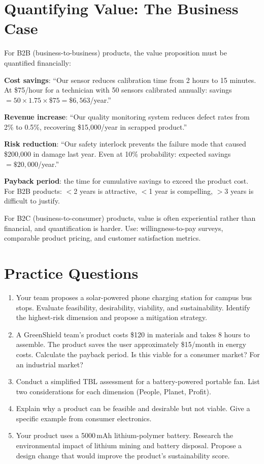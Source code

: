 \documentclass[11pt,letterpaper,twoside,openany]{book}
\begin{document}
\section{Quantifying Value: The Business Case}
For B2B (business-to-business) products, the value proposition must be quantified financially:

\textbf{Cost savings}: ``Our sensor reduces calibration time from 2 hours to 15 minutes. At \$75/hour for a technician with 50 sensors calibrated annually: savings $= 50 \times 1.75 \times \$75 = \$6{,}563$/year.''

\textbf{Revenue increase}: ``Our quality monitoring system reduces defect rates from 2\% to 0.5\%, recovering \$15{,}000/year in scrapped product.''

\textbf{Risk reduction}: ``Our safety interlock prevents the failure mode that caused \$200{,}000 in damage last year. Even at 10\% probability: expected savings $= \$20{,}000$/year.''

\textbf{Payback period}: the time for cumulative savings to exceed the product cost. For B2B products: $<$2 years is attractive, $<$1 year is compelling, $>$3 years is difficult to justify.

For B2C (business-to-consumer) products, value is often experiential rather than financial, and quantification is harder. Use: willingness-to-pay surveys, comparable product pricing, and customer satisfaction metrics.
\section{Practice Questions}
\begin{enumerate}[leftmargin=1.5em]
\item Your team proposes a solar-powered phone charging station for campus bus stops. Evaluate feasibility, desirability, viability, and sustainability. Identify the highest-risk dimension and propose a mitigation strategy.
\item A GreenShield team's product costs \$120 in materials and takes 8 hours to assemble. The product saves the user approximately \$15/month in energy costs. Calculate the payback period. Is this viable for a consumer market? For an industrial market?
\item Conduct a simplified TBL assessment for a battery-powered portable fan. List two considerations for each dimension (People, Planet, Profit).
\item Explain why a product can be feasible and desirable but not viable. Give a specific example from consumer electronics.
\item Your product uses a 5000\,mAh lithium-polymer battery. Research the environmental impact of lithium mining and battery disposal. Propose a design change that would improve the product's sustainability score.
\end{enumerate}
\end{document}
